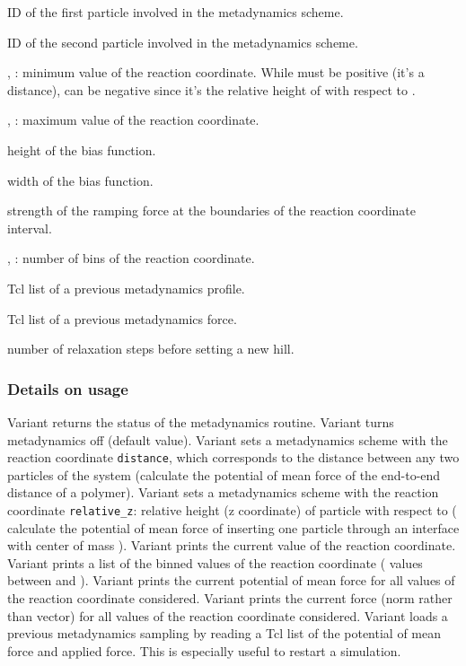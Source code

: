 \begin{arguments}
\item[\var{pid_1}] ID of the first particle involved in the
  metadynamics scheme.
\item[\var{pid_2}] ID of the second particle involved in the
  metadynamics scheme.
\item[\var{d_\mathrm{min}}, \var{z_\mathrm{min}}]: minimum value of
  the reaction coordinate. While  must be positive
  (it's a distance),  can be negative since it's
  the relative height of  with respect to .
\item[\var{d_\mathrm{max}}, \var{z_\mathrm{max}}]: maximum value of
  the reaction coordinate. 
\item[\var{b_\mathrm{height}}] height of the bias function.
\item[\var{b_\mathrm{width}}] width of the bias function.
\item[\var{f_\mathrm{bound}}] strength of the ramping force at the
  boundaries of the reaction coordinate interval.
\item[\var{d_\mathrm{bins}}, \var{z_\mathrm{bins}}]: number of bins of
  the reaction coordinate.
\item[\var{profile\_list}] Tcl list of a previous metadynamics
  profile.
\item[\var{force\_list}] Tcl list of a previous metadynamics force.
\item[\var{numrelaxationsteps}] number of relaxation steps before setting a new hill.
\end{arguments}

\subsubsection{Details on usage}

Variant  returns the status of the metadynamics
routine. Variant  turns metadynamics off (default
value). Variant  sets a metadynamics scheme with the
reaction coordinate \texttt{distance}, which corresponds to the
distance between any two particles of the system (\eg calculate the
potential of mean force of the end-to-end distance of a
polymer). Variant  sets a metadynamics scheme with the
reaction coordinate \texttt{relative_z}: relative height (\ie z
coordinate) of particle  with respect to  (\eg
calculate the potential of mean force of inserting one particle
 through an interface with center of mass
). Variant  prints the current value of the
reaction coordinate. Variant  prints a list of the binned
values of the reaction coordinate (\eg {} values
between  and ). Variant
 prints the current potential of mean force for all values
of the reaction coordinate considered. Variant  prints the
current force (norm rather than vector) for all values of the reaction
coordinate considered. Variant  loads a previous
metadynamics sampling by reading a Tcl list of the potential of mean
force and applied force. This is especially useful to restart a
simulation.


